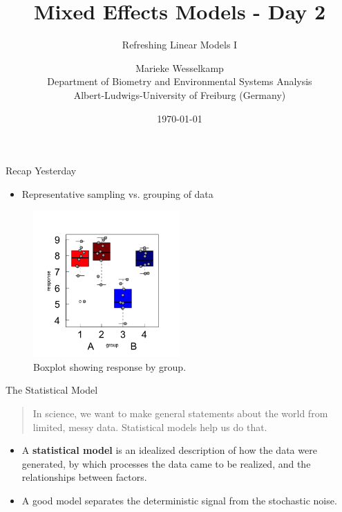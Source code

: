 \documentclass{beamer}
\title{Mixed Effects Models - Day 2}
\subtitle{Refreshing Linear Models I}
\author{Marieke Wesselkamp \\ Department of Biometry and Environmental Systems Analysis \\ Albert-Ludwigs-University of Freiburg (Germany)}
\date{\today}
\begin{document}
\begin{frame}
  \titlepage
\end{frame}

\begin{frame}{Recap Yesterday}
  \begin{itemize}
    \item Representative sampling vs. grouping of data
  \end{itemize}
  
  \begin{figure}[h]
    \centering
    \includegraphics[width=0.5\textwidth]{lectures/day_2_LM_refresh_I/figures/unnamed-chunk-3-1.png}
    \caption{Boxplot showing response by group.}
  \end{figure}
\end{frame}

\begin{frame}{The Statistical Model}
  \begin{quote}
    In science, we want to make general statements about the world from limited, messy data. Statistical models help us do that.
  \end{quote}
  
  \begin{itemize}
    \item A \textbf{statistical model} is an idealized description of how the data were generated, by which processes the data came to be realized, and the relationships between factors.
    \item A good model separates the deterministic signal from the stochastic noise.
  \end{itemize}
\end{frame}
\end{document}
